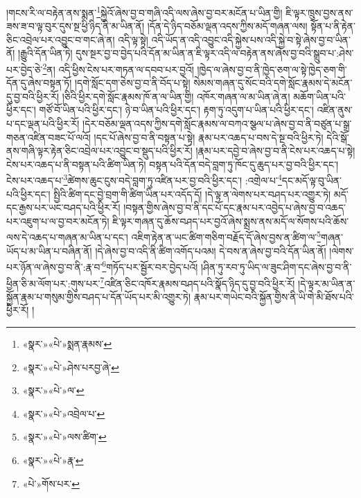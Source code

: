 །གངས་རི་ལ་བརྟེན་ནས་སྨན་\footnote{«སྣར་»«པེ་»སྨན་རྣམས་}སྐྱེའོ་ཞེས་བྱ་བ་གཞི་འདི་ལས་ཞེས་བྱ་བར་མངོན་པ་ཡིན་གྱི། ཇི་ལྟར་ཁྲུས་བྱས་ནས་ཟས་ཟ་བ་ལྟ་བུར་དུས་སྔ་ཕྱི་ཉིད་ནི་མ་ཡིན་ནོ། །དོན་དེ་ཉིད་བཅོམ་ལྡན་འདས་ཀྱིས་མདོ་གཞན་ལས། སྟོན་པ་ནི་རྟེན་ཅིང་འབྲེལ་པར་འབྱུང་བ་གང་ཞེ་ན། འདི་ལྟ་སྟེ། འདི་ཡོད་ན་འདི་འབྱུང་འདི་སྐྱེས་པས་འདི་སྐྱེ་བ་སྟེ་ཞེས་བྱ་བ་ཡིན་ནོ། །རྒྱུའི་དོན་ཡིན་ཏེ། དུས་སྔར་བྱ་བ་བྱེད་པའི་དོན་མ་ཡིན་ན་ཇི་ལྟར་འདི་ལ་བརྟེན་ནས་ཞེས་བྱ་བའི་སྒྲུབ་པ་:ཤེས་པར་བྱེད་ཅེ་\footnote{«སྣར་»«པེ་»ཤེས་པརབྱ་ཞེ་}ན། འདི་ཕྱིས་ངེས་པར་གཏན་ལ་དབབ་པར་བྱའོ། །ཁྱེད་ལ་ཞེས་བྱ་བ་ནི་ཁྱེད་ཅག་ལ་སྟེ་ཁྱེད་ཅག་གི་དོན་དུ་ཞེས་བསྟན་ཏོ། །དགེ་སློང་དག་ཅེས་བྱ་བ་ནི་བོད་པ་སྟེ། སེམས་གཞན་དུ་སོང་བའི་དགེ་སློང་རྣམས་དེ་མངོན་དུ་བྱ་བའི་ཕྱིར་རོ། །ཅིའི་ཕྱིར་དགེ་སློང་རྣམས་ཁོ་ན་ལ་ཡིན་གྱི། འཁོར་གཞན་ལ་མ་ཡིན་ཞེ་ན། མཆོག་ཡིན་པའི་ཕྱིར་དང་། གཙོ་བོ་ཡིན་པའི་ཕྱིར་དང་། ཉེ་བ་ཡིན་པའི་ཕྱིར་དང་། རྟག་ཏུ་འདུག་པ་ཡིན་པའི་ཕྱིར་དང་། འཛིན་ནུས་པ་དང་ལྡན་པའི་ཕྱིར་རོ། །དེར་བཅོམ་ལྡན་འདས་ཀྱིས་དགེ་སློང་རྣམས་ལ་བཀའ་སྩལ་པ་ཞེས་བྱ་བ་ནི་བཙུན་པ་སྒྲ་གཅན་འཛིན་བཟང་པོ་ལའོ། །དང་པོ་ཞེས་བྱ་བ་ནི་བསྟན་པ་སྟེ། རྣམ་པར་འཆད་པ་བས་དེ་སྔ་བའི་ཕྱིར་ཏེ། དེའི་སྒོ་ནས་གཞི་ལྟར་རྟེན་ཅིང་འབྲེལ་པར་འབྱུང་བ་སྡུད་པའི་ཕྱིར་རོ། །རྣམ་པར་དབྱེ་བ་ཞེས་བྱ་བ་ནི་ངེས་པར་འཆད་པ་སྟེ། ངེས་པར་འཆད་པ་ནི་བསྟན་པའི་ཚིག་ཡིན་ཏེ། བསྟན་པའི་དོན་བདེ་བླག་ཏུ་ཁོང་དུ་ཆུད་པར་བྱ་བའི་ཕྱིར་དང་། ངེས་པར་འཆད་པ་\footnote{«སྣར་»«པེ་»ལ་}ཚེགས་ཆུང་ངུས་བདེ་བླག་ཏུ་འཛིན་པར་བྱ་བའི་ཕྱིར་དང་། :འགྲེལ་པ་\footnote{«སྣར་»«པེ་»འབྲེལ་པ་}དང་མདོ་ལྟ་བུ་ཡིན་པའི་ཕྱིར་དང་། སྤྱིའི་ཚིག་དང་བྱེ་བྲག་གི་ཚིག་ཡིན་པར་འདོད་དོ། །དེ་ལྟ་ན་ལེགས་པར་བཤད་པར་འགྱུར་ཏེ། མདོ་དང་རྒྱས་པར་ཡང་བཤད་པའི་ཕྱིར་རོ། །བསྟན་གྱིས་ཞེས་བྱ་བ་ནི་དང་པོ་དང་རྣམ་པར་འབྱེད་པ་ཞེས་བྱ་བ་འཆད་པར་འཇུག་པ་ལ་བྱ་བར་མངོན་ཏེ། ཇི་ལྟར་གཞན་དུ་ཆོས་བཤད་པར་བྱའོ་ཞེས་སྨྲས་ནས་མདོ་ལ་སོགས་པའི་ཆོས་ལས་དེ་འཆད་པ་གཞན་མ་ཡིན་པ་དང་། འཇིག་རྟེན་ན་ཡང་ཚིག་གཅིག་བརྗོད་དོ་ཞེས་བྱས་ན་ཚིག་ལ་\footnote{«སྣར་»«པེ་»ལས་ཚིག་}གཞན་ཡོད་པ་མ་ཡིན་པ་བཞིན་ནོ། །དེ་ཞེས་བྱ་བ་འདི་ནི་ཚིག་འགོད་པའམ། དེ་བས་ན་ཞེས་བྱ་བའི་དོན་ཡིན་ནོ། །ལེགས་པར་ཉོན་ལ་ཞེས་བྱ་བ་ནི་:རྣ་བ་\footnote{«སྣར་»«པེ་»རྣ་}གཏོད་པར་སྦྱོར་བར་བྱེད་པའོ། །ཤིན་ཏུ་རབ་ཏུ་ཡིད་ལ་ཟུང་ཤིག་དང་ཞེས་བྱ་བ་ནི་ཕྱིན་ཅི་མ་ལོག་པར་:གུས་པར་\footnote{«པེ་»གོས་པར་}འཛིན་ཅིང་འཁོར་རྣམས་བཤད་པའི་སྣོད་ཉིད་དུ་བྱ་བའི་ཕྱིར་རོ། །དེ་ལྟར་མ་ཡིན་ན་སྐྱོན་རྣམ་པ་གསུམ་གྱིས་བཤད་པ་དོན་ཡོད་པར་མི་འགྱུར་ཏེ། རྣམ་པར་གཡེང་བའི་སྐྱོན་གྱིས་ནི་ཡི་གེ་མི་ཐོས་པའི་ཕྱིར་རོ། །
